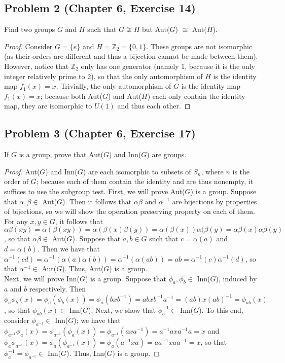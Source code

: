 \documentclass{article}
\begin{document}
\subsection*{Problem 2 (Chapter 6, Exercise 14)}

Find two groups $G$ and $H$ such that $G \not\cong H$ but Aut($G$) $\cong$ Aut($H$).

\begin{proof}

Consider $G = \{e\}$ and $H = \mathbb{Z}_2 = \{0, 1\}$. These groups are not isomorphic (as their orders are different and thus a bijection cannot be made between them). However, notice that $\mathbb{Z}_2$ only has one generator (namely 1, because it is the only integer relatively prime to 2), so that the only automorphism of $H$ is the identity map $f_1(x) = x$. Trivially, the only automorphism of $G$ is the identity map $f_1(x) = x$; because both Aut($G$) and Aut($H$) each only contain the identity map, they are isomorphic to $U(1)$ and thus each other.    

\end{proof}

\subsection*{Problem 3 (Chapter 6, Exercise 17)}
If $G$ is a group, prove that Aut($G$) and Inn($G$) are groups.

\begin{proof}
Aut($G$) and Inn($G$) are each isomorphic to subsets of $S_n$, where $n$ is the order of $G$; because each of them contain the identity and are thus nonempty, it suffices to use the subgroup test. First, we will prove Aut($G$) is a group. Suppose that $\alpha, \beta \in$ Aut($G$). Then it follows that $\alpha\beta$ and $\alpha^{-1}$ are bijections by properties of bijections, so we will show the operation preserving property on each of them. For any $x, y \in G$, it follows that $\alpha\beta(xy) = \alpha(\beta(xy)) = \alpha(\beta(x)\beta(y)) = \alpha(\beta(x))\alpha(\beta(y) = \alpha\beta(x)\alpha\beta(y)$, so that $\alpha\beta \in$ Aut($G$). Suppose that $a, b \in G$ such that $c = \alpha(a)$ and $d = \alpha(b)$. Then we have that $\alpha^{-1}(cd) = \alpha^{-1}(\alpha(a)\alpha(b)) = \alpha^{-1}(\alpha(ab)) = ab = \alpha^{-1}(c)\alpha^{-1}(d)$, so that $\alpha^{-1} \in$ Aut($G$). Thus, Aut($G$) is a group. \\
Next, we will prove Inn($G$) is a group. Suppose that $\phi_a, \phi_b \in$ Inn($G$), induced by $a$ and $b$ respectively. Then $\phi_a\phi_b(x) = \phi_a(\phi_b(x)) = \phi_a(bxb^{-1}) = abxb^{-1}a^{-1} = (ab)x(ab)^{-1} = \phi_{ab}(x)$, so that $\phi_{ab}(x) \in$ Inn($G$). Next, we show that $\phi_a^{-1} \in$ Inn($G$). To this end, consider $\phi_{a^{-1}} \in$ Inn($G$); we have that $\phi_{a^{-1}}\phi_a(x) = \phi_{a^{-1}}(\phi_a(x)) = \phi_{a^{-1}}(axa^{-1}) = a^{-1}axa^{-1}a = x$ and $\phi_a\phi_{a^{-1}}(x) = \phi_a(\phi_{a^{-1}}(x)) = \phi_a(a^{-1}xa) = aa^{-1}xaa^{-1} = x$, so that $\phi_a^{-1} = \phi_{a^{-1}} \in$ Inn($G$). Thus, Inn($G$) is a group. 
\end{proof}
\end{document}

